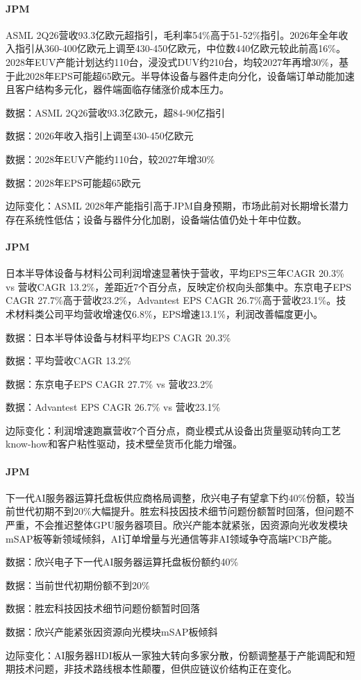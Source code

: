 \documentclass[11pt]{ctexart}
\begin{document}
\paragraph{JPM} ASML 2Q26营收93.3亿欧元超指引，毛利率54\%高于51-52\%指引。2026年全年收入指引从360-400亿欧元上调至430-450亿欧元，中位数440亿欧元较此前高16\%。2028年EUV产能计划达约110台，浸没式DUV约210台，均较2027年再增30\%，基于此2028年EPS可能超65欧元。半导体设备与器件走向分化，设备端订单动能加速且客户结构多元化，器件端面临存储涨价成本压力。
{\small\color{refgray}数据：ASML 2Q26营收93.3亿欧元，超84-90亿指引\par}
{\small\color{refgray}数据：2026年收入指引上调至430-450亿欧元\par}
{\small\color{refgray}数据：2028年EUV产能约110台，较2027年增30\%\par}
{\small\color{refgray}数据：2028年EPS可能超65欧元\par}
{\small\color{refgray}边际变化：ASML 2028年产能指引高于JPM自身预期，市场此前对长期增长潜力存在系统性低估；设备与器件分化加剧，设备端估值仍处十年中位数。\par}
\paragraph{JPM} 日本半导体设备与材料公司利润增速显著快于营收，平均EPS三年CAGR 20.3\% vs 营收CAGR 13.2\%，差距近7个百分点，反映定价权向头部集中。东京电子EPS CAGR 27.7\%高于营收23.2\%，Advantest EPS CAGR 26.7\%高于营收23.1\%。技术材料类公司平均营收增速仅6.8\%，EPS增速13.1\%，利润改善幅度更小。
{\small\color{refgray}数据：日本半导体设备与材料平均EPS CAGR 20.3\%\par}
{\small\color{refgray}数据：平均营收CAGR 13.2\%\par}
{\small\color{refgray}数据：东京电子EPS CAGR 27.7\% vs 营收23.2\%\par}
{\small\color{refgray}数据：Advantest EPS CAGR 26.7\% vs 营收23.1\%\par}
{\small\color{refgray}边际变化：利润增速跑赢营收7个百分点，商业模式从设备出货量驱动转向工艺know-how和客户粘性驱动，技术壁垒货币化能力增强。\par}
\paragraph{JPM} 下一代AI服务器运算托盘板供应商格局调整，欣兴电子有望拿下约40\%份额，较当前世代初期不到20\%大幅提升。胜宏科技因技术细节问题份额暂时回落，但问题不严重，不会推迟整体GPU服务器项目。欣兴产能本就紧张，因资源向光收发模块mSAP板等新领域倾斜，AI订单增量与光通信等非AI领域争夺高端PCB产能。
{\small\color{refgray}数据：欣兴电子下一代AI服务器运算托盘板份额约40\%\par}
{\small\color{refgray}数据：当前世代初期份额不到20\%\par}
{\small\color{refgray}数据：胜宏科技因技术细节问题份额暂时回落\par}
{\small\color{refgray}数据：欣兴产能紧张因资源向光模块mSAP板倾斜\par}
{\small\color{refgray}边际变化：AI服务器HDI板从一家独大转向多家分散，份额调整基于产能调配和短期技术问题，非技术路线根本性颠覆，但供应链议价结构正在变化。\par}
\end{document}
